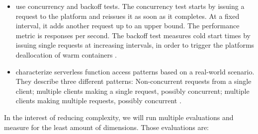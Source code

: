 \begin{itemize}
    \item \citeauthor{McGrath2017} use concurrency and backoff tests. The concurrency test starts by issuing a request to the platform and reissues it as soon as it completes. At a fixed interval, it adds another request up to an upper bound. The performance metric is responses per second. The backoff test measures cold start times by issuing single requests at increasing intervals, in order to trigger the platforms deallocation of warm containers \cite{McGrath2017}.
    \item \citeauthor{Hall2019} characterize serverless function access patterns based on a real-world scenario. They describe three different patterns: Non-concurrent requests from a single client; multiple clients making a single request, possibly concurrent; multiple clients making multiple requests, possibly concurrent \cite{Hall2019}.
\end{itemize}

In the interest of reducing complexity, we will run multiple evaluations and measure for the least amount of dimensions. Those evaluations are:

